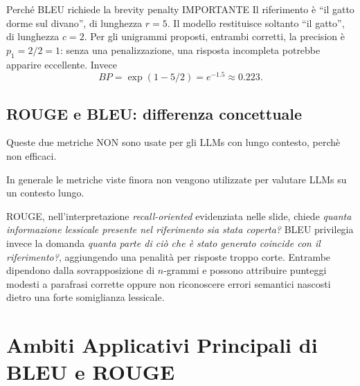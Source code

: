 \begin{example}{Perché BLEU richiede la brevity penalty IMPORTANTE}
Il riferimento è ``il gatto dorme sul divano'', di lunghezza $r=5$. Il modello restituisce soltanto ``il gatto'', di lunghezza $c=2$. Per gli unigrammi proposti, entrambi corretti, la precision è $p_1=2/2=1$: senza una penalizzazione, una risposta incompleta potrebbe apparire eccellente. Invece
\begin{equation}
BP=\exp(1-5/2)=e^{-1.5}\approx0.223.
\end{equation}
\end{example}

\subsection{ROUGE e BLEU: differenza concettuale}
Queste due metriche NON sono usate per gli LLMs con lungo contesto, perchè non efficaci.

In generale le metriche viste finora non vengono utilizzate per valutare LLMs su un contesto lungo.

ROUGE, nell'interpretazione \emph{recall-oriented} evidenziata nelle slide, chiede \emph{quanta informazione lessicale presente nel riferimento sia stata coperta?} BLEU privilegia invece la domanda \emph{quanta parte di ciò che è stato generato coincide con il riferimento?}, aggiungendo una penalità per risposte troppo corte. Entrambe dipendono dalla sovrapposizione di $n$-grammi e possono attribuire punteggi modesti a parafrasi corrette oppure non riconoscere errori semantici nascosti dietro una forte somiglianza lessicale.

\section*{Ambiti Applicativi Principali di BLEU e ROUGE}

